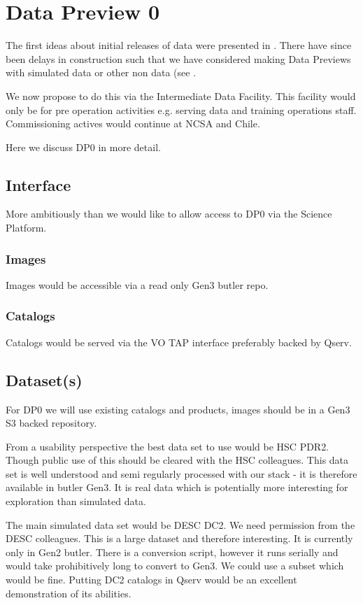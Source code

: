 \section{Data Preview 0}\label{sec:dp0}
The first ideas about initial releases of \RO data were presented in .
There have since been delays in construction such that we have considered making Data Previews with
simulated data or other non \RO data (see .

We now propose to do this via the Intermediate Data Facility. This facility would only be for
pre operation activities e.g. serving data and training operations staff.
Commissioning actives would continue at NCSA and Chile.

Here we discuss DP0 in more detail.

\subsection {Interface}
More ambitiously than   we would like to allow access to DP0 via
the Science Platform.
\subsubsection{Images}
Images would be accessible via a read only Gen3 butler repo.
\subsubsection{Catalogs}
Catalogs would be served via the VO TAP interface preferably backed by Qserv.



\subsection {Dataset(s)} \label{sec:dataset}

For DP0 we will use existing catalogs and products, images should be in a Gen3 S3 backed repository.

From a usability perspective the best data set to use would be HSC PDR2. Though public use of
this should be cleared with the HSC colleagues. This data set is well understood and semi regularly processed with our stack - it is therefore available in butler Gen3. It is real data which is potentially
more interesting for exploration than simulated data.

The main simulated data set would be DESC DC2. We need permission from the DESC colleagues. This is a large dataset and therefore interesting. It is currently only in Gen2 butler. There is a conversion script, however it
runs serially and would take prohibitively long to convert to Gen3. We could use a subset which would be fine.  Putting DC2 catalogs in Qserv would be an excellent demonstration of its abilities.


